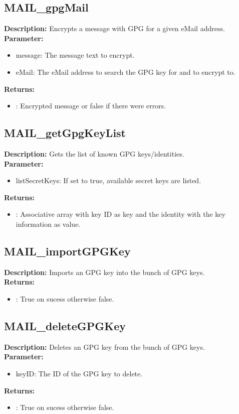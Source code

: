 \subsection{MAIL\_gpgMail}
\textbf{Description:} Encrypts a message with GPG for a given eMail address.\\
\textbf{Parameter:}
\begin{itemize}
\item message: The message text to encrypt.
\item eMail: The eMail address to search the GPG key for and to encrypt to.
\end{itemize}
\textbf{Returns:}
\begin{itemize}
\item : Encrypted message or false if there were errors.
\end{itemize}

\subsection{MAIL\_getGpgKeyList}
\textbf{Description:} Gets the list of known GPG keys/identities.\\
\textbf{Parameter:}
\begin{itemize}
\item listSecretKeys: If set to true, available secret keys are listed.
\end{itemize}
\textbf{Returns:}
\begin{itemize}
\item : Associative array with key ID as key and the identity with the key information as value.
\end{itemize}

\subsection{MAIL\_importGPGKey}
\textbf{Description:} Imports an GPG key into the bunch of GPG keys.\\
\textbf{Returns:}
\begin{itemize}
\item : True on sucess otherwise false.
\end{itemize}

\subsection{MAIL\_deleteGPGKey}
\textbf{Description:} Deletes an GPG key from the bunch of GPG keys.\\
\textbf{Parameter:}
\begin{itemize}
\item keyID: The ID of the GPG key to delete.
\end{itemize}
\textbf{Returns:}
\begin{itemize}
\item : True on sucess otherwise false.
\end{itemize}

